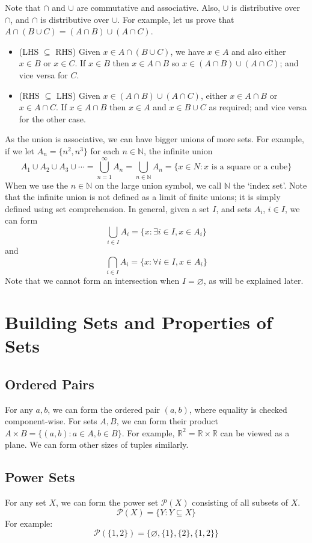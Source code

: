 \documentclass{article}
\begin{document}
	Note that $\cap$ and $\cup$ are commutative and associative. Also, $\cup$ is distributive over $\cap$, and $\cap$ is distributive over $\cup$. For example, let us prove that $A \cap (B \cup C) = (A \cap B) \cup (A \cap C)$.
	\begin{itemize}
		\item (LHS $\subseteq$ RHS) Given $x \in A \cap (B \cup C)$, we have $x \in A$ and also either $x \in B$ or $x \in C$. If $x \in B$ then $x \in A \cap B$ so $x \in (A \cap B) \cup (A \cap C)$; and vice versa for $C$.
		\item (RHS $\subseteq$ LHS) Given $x \in (A \cap B) \cup (A \cap C)$, either $x \in A \cap B$ or $x \in A \cap C$. If $x \in A \cap B$ then $x \in A$ and $x \in B \cup C$ as required; and vice versa for the other case.
	\end{itemize}
	As the union is associative, we can have bigger unions of more sets. For example, if we let $A_n = \{ n^2, n^3 \}$ for each $n \in \mathbb N$, the infinite union
	\[ A_1 \cup A_2 \cup A_3 \cup \cdots = \bigcup_{n=1}^\infty A_n = \bigcup_{n \in \mathbb N} A_n = \{ x \in N: x \text{ is a square or a cube} \} \]
	When we use the $n \in \mathbb N$ on the large union symbol, we call $\mathbb N$ the `index set'. Note that the infinite union is not defined as a limit of finite unions; it is simply defined using set comprehension. In general, given a set $I$, and sets $A_i$, $i \in I$, we can form
	\[ \bigcup_{i \in I}A_i = \{ x: \exists i \in I, x \in A_i \} \]
	and
	\[ \bigcap_{i \in I}A_i = \{ x: \forall i \in I, x \in A_i \} \]
	Note that we cannot form an intersection when $I = \varnothing$, as will be explained later.

	\section{Building Sets and Properties of Sets}
	\subsection{Ordered Pairs}
	For any $a, b$, we can form the ordered pair $(a, b)$, where equality is checked component-wise. For sets $A, B$, we can form their product $A \times B = \{ (a, b) : a \in A, b \in B \}$. For example, $\mathbb R^2 = \mathbb R \times \mathbb R$ can be viewed as a plane. We can form other sizes of tuples similarly.

	\subsection{Power Sets}
	For any set $X$, we can form the power set $\mathcal P(X)$ consisting of all subsets of $X$.
	\[ \mathcal P(X) = \{ Y: Y \subseteq X \} \]
	For example:
	\[ \mathcal P(\{ 1, 2 \}) = \{ \varnothing, \{ 1 \}, \{ 2 \}, \{ 1, 2\} \} \]
\end{document}
